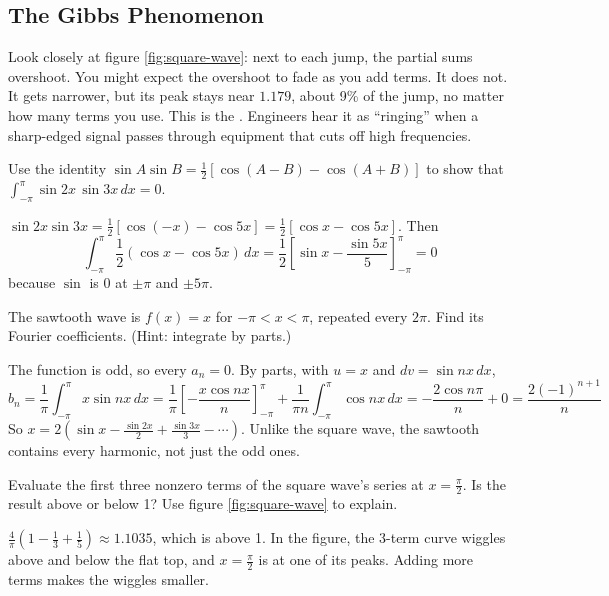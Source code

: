 \subsection{The Gibbs Phenomenon}
Look closely at figure \ref{fig:square-wave}: next to each jump, the partial sums
overshoot. You might expect the overshoot to fade as you add terms. It does not.
It gets narrower, but its peak stays near $1.179$, about 9\% of the jump, no
matter how many terms you use. This is the . Engineers
hear it as ``ringing'' when a sharp-edged signal passes through equipment that
cuts off high frequencies.

\begin{Exercise}[title={Orthogonality by Hand}, label=fs_orth]
Use the identity $\sin A\sin B = \frac{1}{2}[\cos(A - B) - \cos(A + B)]$ to show that
$\int_{-\pi}^{\pi}\sin 2x\,\sin 3x\,dx = 0$.
\end{Exercise}
\begin{Answer}[ref=fs_orth]
$\sin 2x\sin 3x = \frac{1}{2}[\cos(-x) - \cos 5x] = \frac{1}{2}[\cos x - \cos 5x]$. Then
$$\int_{-\pi}^{\pi} \frac{1}{2}(\cos x - \cos 5x)\,dx = \frac{1}{2}\left[\sin x - \frac{\sin 5x}{5}\right]_{-\pi}^{\pi} = 0$$
because $\sin$ is 0 at $\pm\pi$ and $\pm 5\pi$.
\end{Answer}

\begin{Exercise}[title={The Sawtooth Wave}, label=fs_saw]
The sawtooth wave is $f(x) = x$ for $-\pi < x < \pi$, repeated every $2\pi$. Find its
Fourier coefficients. (Hint: integrate by parts.)
\end{Exercise}
\begin{Answer}[ref=fs_saw]
The function is odd, so every $a_n = 0$. By parts, with $u = x$ and $dv = \sin nx\,dx$,
$$b_n = \frac{1}{\pi}\int_{-\pi}^{\pi} x\sin nx\,dx = \frac{1}{\pi}\left[-\frac{x\cos nx}{n}\right]_{-\pi}^{\pi} + \frac{1}{\pi n}\int_{-\pi}^{\pi}\cos nx\,dx = -\frac{2\cos n\pi}{n} + 0 = \frac{2(-1)^{n+1}}{n}$$
So $x = 2\left(\sin x - \frac{\sin 2x}{2} + \frac{\sin 3x}{3} - \cdots\right)$. Unlike the
square wave, the sawtooth contains every harmonic, not just the odd ones.
\end{Answer}

\begin{Exercise}[title={Three Terms}, label=fs_three]
Evaluate the first three nonzero terms of the square wave's series at $x = \frac{\pi}{2}$.
Is the result above or below 1? Use figure \ref{fig:square-wave} to explain.
\end{Exercise}
\begin{Answer}[ref=fs_three]
$\frac{4}{\pi}\left(1 - \frac{1}{3} + \frac{1}{5}\right) \approx 1.1035$, which is above 1. In the
figure, the 3-term curve wiggles above and below the flat top, and $x = \frac{\pi}{2}$
is at one of its peaks. Adding more terms makes the wiggles smaller.
\end{Answer}

